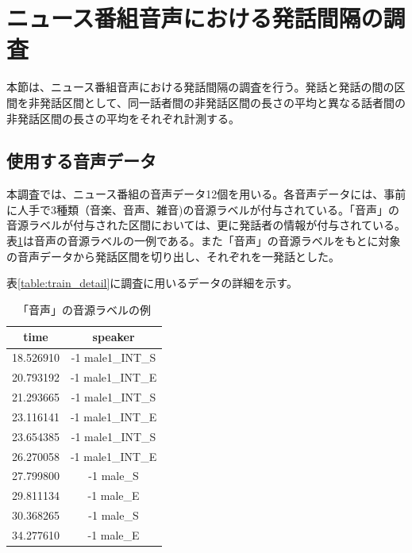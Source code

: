 \section{ニュース番組音声における発話間隔の調査}
\label{section:research_news}
本節は、ニュース番組音声における発話間隔の調査を行う。発話と発話の間の区間を非発話区間として、同一話者間の非発話区間の長さの平均と異なる話者間の非発話区間の長さの平均をそれぞれ計測する。

\subsection{使用する音声データ}
\label{section:detail_train_news}
本調査では、ニュース番組の音声データ12個を用いる。各音声データには、事前に人手で3種類（音楽、音声、雑音)の音源ラベルが付与されている。「音声」の音源ラベルが付与された区間においては、更に発話者の情報が付与されている。表\ref{fig:example_label}は音声の音源ラベルの一例である。また「音声」の音源ラベルをもとに対象の音声データから発話区間を切り出し、それぞれを一発話とした。\par
表\ref{table:train_detail}に調査に用いるデータの詳細を示す。\vspace{0.2in}

\begin{table}[H]
\begin{center}
\caption{「音声」の音源ラベルの例 \label{fig:example_label}}
\begin{tabular}{|c|c|}
\hline
time      & speaker          \\ \hline
18.526910 & -1 male1\_INT\_S \\ \hline
20.793192 & -1 male1\_INT\_E \\ \hline
21.293665 & -1 male1\_INT\_S \\ \hline
23.116141 & -1 male1\_INT\_E \\ \hline
23.654385 & -1 male1\_INT\_S \\ \hline
26.270058 & -1 male1\_INT\_E \\ \hline
27.799800 & -1 male\_S       \\ \hline
29.811134 & -1 male\_E       \\ \hline
30.368265 & -1 male\_S       \\ \hline
34.277610 & -1 male\_E       \\ \hline
\end{tabular}
\end{center}
\end{table}

